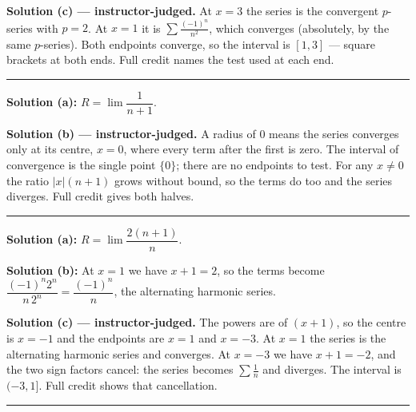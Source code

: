 \documentclass[12pt]{article}
\begin{document}
\textbf{Solution (c) --- instructor-judged.} At $x = 3$ the series is the convergent $p$-series with $p = 2$. At $x = 1$ it is $\sum \frac{(-1)^n}{n^2}$, which converges (absolutely, by the same $p$-series). Both endpoints converge, so the interval is $[1, 3]$ --- square brackets at both ends. Full credit names the test used at each end.

\vspace{0.2cm}\noindent\rule{\linewidth}{0.2pt}\vspace{0.2cm}


\textbf{Solution (a):} $R = \lim \dfrac{1}{n+1}$. 

\textbf{Solution (b) --- instructor-judged.} A radius of $0$ means the series converges only at its centre, $x = 0$, where every term after the first is zero. The interval of convergence is the single point $\{0\}$; there are no endpoints to test. For any $x \neq 0$ the ratio $|x|(n+1)$ grows without bound, so the terms do too and the series diverges. Full credit gives both halves.

\vspace{0.2cm}\noindent\rule{\linewidth}{0.2pt}\vspace{0.2cm}


\textbf{Solution (a):} $R = \lim \dfrac{2(n+1)}{n}$. 

\textbf{Solution (b):} At $x = 1$ we have $x + 1 = 2$, so the terms become $\dfrac{(-1)^n 2^n}{n\,2^n} = \dfrac{(-1)^n}{n}$, the alternating harmonic series. 

\textbf{Solution (c) --- instructor-judged.} The powers are of $(x+1)$, so the centre is $x = -1$ and the endpoints are $x = 1$ and $x = -3$. At $x = 1$ the series is the alternating harmonic series and converges. At $x = -3$ we have $x + 1 = -2$, and the two sign factors cancel: the series becomes $\sum \frac{1}{n}$ and diverges. The interval is $(-3, 1]$. Full credit shows that cancellation.

\vspace{0.2cm}\noindent\rule{\linewidth}{0.2pt}\vspace{0.2cm}

\end{document}
